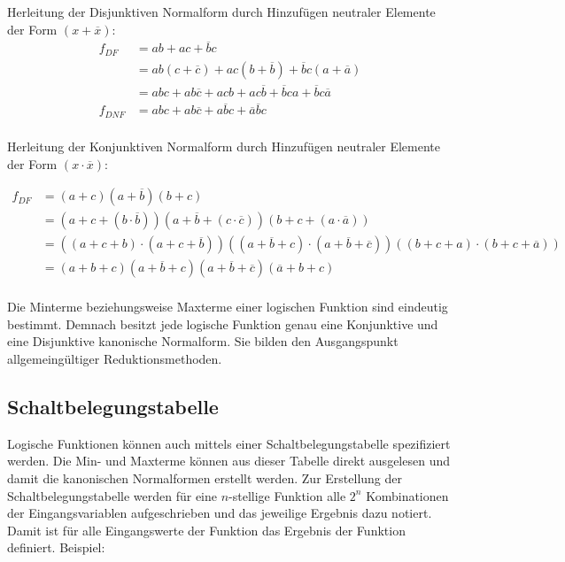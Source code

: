 \documentclass[11pt,a4paper]{scrreprt}
\begin{document}
Herleitung der Disjunktiven Normalform durch Hinzufügen neutraler Elemente der Form $(x + \overline{x})$:
\begin{align*}
	f_{\textit{DF}} &= ab + ac + \overline{b}c    \\
	                &= ab(c + \overline{c})
	                 + ac(b + \overline{b})
	                 + \overline{b}c(a + \overline{a})    \\
	                &= abc + ab\overline{c}
	                 + acb + ac\overline{b}
	                 + \overline{b}ca + \overline{b}c\overline{a}    \\
	f_{\textit{DNF}} &= abc + ab\overline{c} + a\overline{b}c
	                  + \overline{a}\overline{b}c    \\
\end{align*}

Herleitung der Konjunktiven Normalform durch Hinzufügen neutraler Elemente der Form $(x \cdot \overline{x})$:

\begin{align*}
	f_{\textit{DF}} &= (a + c) (a + \overline{b}) (b + c) \\
					&= (a + c + (b \cdot \overline{b})) 
						(a + \overline{b} + (c \cdot \overline{c})) 
						(b + c + (a \cdot \overline{a})) \\
					&= ((a + c + b) \cdot (a + c + \overline{b})) 
						((a + \overline{b} + c) \cdot 
						(a + \overline{b} + \overline{c}))
						((b + c + a) \cdot (b + c + \overline{a})) \\
					&= (a + b + c) (a + \overline{b} + c)
						(a + \overline{b} + \overline{c})
						(\overline{a} + b + c) \\
\end{align*}

Die Minterme beziehungsweise Maxterme einer logischen Funktion sind eindeutig bestimmt. Demnach besitzt jede logische Funktion genau eine Konjunktive und eine Disjunktive kanonische Normalform. Sie bilden den Ausgangspunkt allgemeingültiger Reduktionsmethoden.

\subsection{Schaltbelegungstabelle}
Logische Funktionen können auch mittels einer Schaltbelegungstabelle spezifiziert werden. Die Min- und Maxterme können aus dieser Tabelle direkt ausgelesen und damit die kanonischen Normalformen erstellt werden. Zur Erstellung der Schaltbelegungstabelle werden für eine $n$-stellige Funktion alle $2^n$ Kombinationen der Eingangsvariablen aufgeschrieben und das jeweilige Ergebnis dazu notiert. Damit ist für alle Eingangswerte der Funktion das Ergebnis der Funktion definiert. Beispiel:
\end{document}
